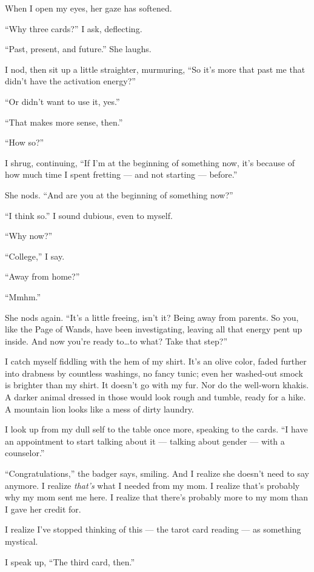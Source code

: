 When I open my eyes, her gaze has softened.

``Why three cards?'' I ask, deflecting.

``Past, present, and future.'' She laughs.

I nod, then sit up a little straighter, murmuring, ``So it's more that past me that didn't have the activation energy?''

``Or didn't want to use it, yes.''

``That makes more sense, then.''

``How so?''

I shrug, continuing, ``If I'm at the beginning of something now, it's because of how much time I spent fretting --- and not starting --- before.''

She nods. ``And are you at the beginning of something now?''

``I think so.'' I sound dubious, even to myself.

``Why now?''

``College,'' I say.

``Away from home?''

``Mmhm.''

She nods again. ``It's a little freeing, isn't it? Being away from parents. So you, like the Page of Wands, have been investigating, leaving all that energy pent up inside. And now you're ready to\ldots{}to what? Take that step?''

I catch myself fiddling with the hem of my shirt. It's an olive color, faded further into drabness by countless washings, no fancy tunic; even her washed-out smock is brighter than my shirt. It doesn't go with my fur. Nor do the well-worn khakis. A darker animal dressed in those would look rough and tumble, ready for a hike. A mountain lion looks like a mess of dirty laundry.

I look up from my dull self to the table once more, speaking to the cards. ``I have an appointment to start talking about it --- talking about gender --- with a counselor.''

``Congratulations,'' the badger says, smiling. And I realize she doesn't need to say anymore. I realize \emph{that's} what I needed from my mom. I realize that's probably why my mom sent me here. I realize that there's probably more to my mom than I gave her credit for.

I realize I've stopped thinking of this --- the tarot card reading --- as something mystical.

I speak up, ``The third card, then.''

